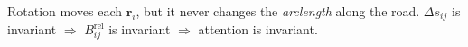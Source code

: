 \documentclass[preview]{standalone}
\begin{document}
\begin{center}
Rotation moves each $\mathbf{r}_i$, but it never changes the \emph{arclength} along the road.  $\Delta s_{ij}$ is invariant $\Rightarrow$ $B^{\mathrm{rel}}_{ij}$ is invariant $\Rightarrow$ attention is invariant.
\end{center}
\end{document}
